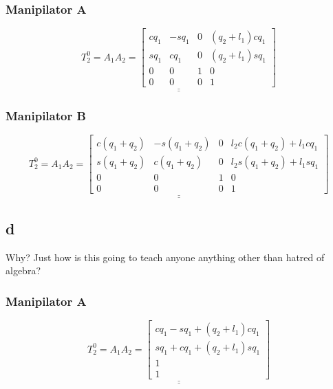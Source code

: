 \documentclass{article}
\begin{document}
\subsubsection*{Manipilator A}
\begin{equation*}
\underline{\underline{T^0_2 = A_1 A_2 =
        \begin{bmatrix}
        c q_1 & - s q_1 & 0  & (q_2 + l_1) c q_1 \\
        s q_1 & c q_1   & 0  & (q_2 + l_1) s q_1 \\
        0     & 0       & 1  & 0        \\
        0     & 0       & 0  & 1
        \end{bmatrix}}}
\end{equation*}

\subsubsection*{Manipilator B}

\begin{equation*}
\underline{\underline{T^0_2 = A_1 A_2 =
        \begin{bmatrix}
        c (q_1 + q_2) & - s (q_1 + q_2) & 0  & l_2 c (q_1 + q_2) + l_1 c q_1 \\
        s (q_1 + q_2) & c (q_1 + q_2)   & 0  & l_2 s (q_1 + q_2) + l_1 s q_1 \\
        0     & 0       & 1  & 0        \\
        0     & 0       & 0  & 1
        \end{bmatrix}}}
\end{equation*}

\subsection{d}

Why? Just how is this going to teach anyone anything other than hatred of algebra?
\subsubsection*{Manipilator A}
\begin{equation*}
\underline{\underline{T^0_2 = A_1 A_2 =
        \begin{bmatrix}
        c q_1 - s q_1 + (q_2 + l_1) c q_1 \\
        s q_1 + c q_1   + (q_2 + l_1) s q_1 \\
        1      \\
        1
        \end{bmatrix}}}
\end{equation*}
\end{document}

